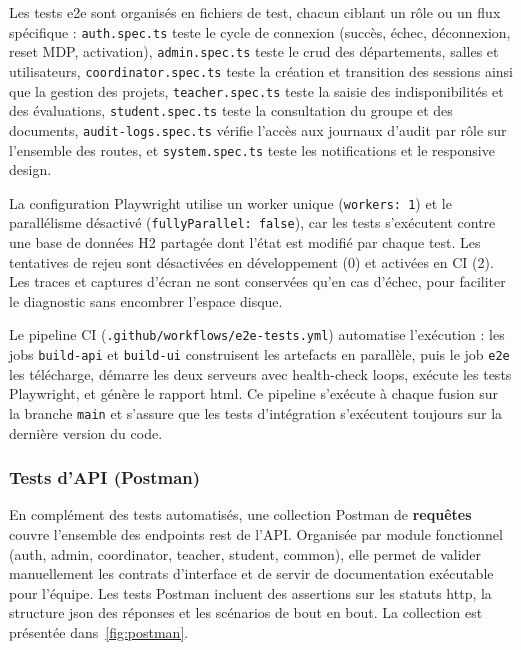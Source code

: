 Les tests \acrshort{e2e} sont organisés en  fichiers de test, chacun ciblant un rôle ou un flux spécifique : \texttt{auth.spec.ts} teste le cycle de connexion (succès, échec, déconnexion, reset MDP, activation), \texttt{admin.spec.ts} teste le \acrshort{crud} des départements, salles et utilisateurs, \texttt{coordinator.spec.ts} teste la création et transition des sessions ainsi que la gestion des projets, \texttt{teacher.spec.ts} teste la saisie des indisponibilités et des évaluations, \texttt{student.spec.ts} teste la consultation du groupe et des documents, \texttt{audit-logs.spec.ts} vérifie l'accès aux journaux d'audit par rôle sur l'ensemble des routes, et \texttt{system.spec.ts} teste les notifications et le responsive design.

La configuration Playwright utilise un worker unique (\texttt{workers: 1}) et le parallélisme désactivé (\texttt{fullyParallel: false}), car les tests s'exécutent contre une base de données H2 partagée dont l'état est modifié par chaque test. Les tentatives de rejeu sont désactivées en développement (0) et activées en CI (2). Les traces et captures d'écran ne sont conservées qu'en cas d'échec, pour faciliter le diagnostic sans encombrer l'espace disque.

Le pipeline CI (\texttt{.github/workflows/e2e-tests.yml}) automatise l'exécution : les jobs \texttt{build-api} et \texttt{build-ui} construisent les artefacts en parallèle, puis le job \texttt{e2e} les télécharge, démarre les deux serveurs avec health-check loops, exécute les tests Playwright, et génère le rapport \acrshort{html}. Ce pipeline s'exécute à chaque fusion sur la branche \texttt{main} et s'assure que les tests d'intégration s'exécutent toujours sur la dernière version du code.

\subsubsection{Tests d'API (Postman)}
\label{ch5:postman_tests}

En complément des tests automatisés, une collection Postman de \textbf{ requêtes} couvre l'ensemble des endpoints \acrshort{rest} de l'API. Organisée par module fonctionnel (auth, admin, coordinator, teacher, student, common), elle permet de valider manuellement les contrats d'interface et de servir de documentation exécutable pour l'équipe. Les tests Postman incluent des assertions sur les statuts \acrshort{http}, la structure \acrshort{json} des réponses et les scénarios de bout en bout. La collection est présentée dans~\cref{fig:postman}.

